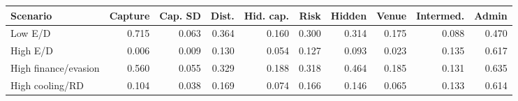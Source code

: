 \begingroup
\begin{center}
\begin{minipage}{\textwidth}
\centering
\scriptsize
\setlength{\tabcolsep}{3pt}
\begin{tabular*}{\textwidth}{@{\extracolsep{\fill}}lrrrrrrrrr@{}}
\toprule
Scenario & Capture & Cap. SD & Dist. & Hid. cap. & Risk & Hidden & Venue & Intermed. & Admin \\
\midrule
Low E/D & 0.715 & 0.063 & 0.364 & 0.160 & 0.300 & 0.314 & 0.175 & 0.088 & 0.470 \\
High E/D & 0.006 & 0.009 & 0.130 & 0.054 & 0.127 & 0.093 & 0.023 & 0.135 & 0.617 \\
High finance/evasion & 0.560 & 0.055 & 0.329 & 0.188 & 0.318 & 0.464 & 0.185 & 0.131 & 0.635 \\
High cooling/RD & 0.104 & 0.038 & 0.169 & 0.074 & 0.166 & 0.146 & 0.065 & 0.133 & 0.614 \\
\bottomrule
\end{tabular*}
\par\smallskip
\captionsetup{hypcap=false}
\label{tab:interactions}
\end{minipage}
\end{center}
\endgroup

